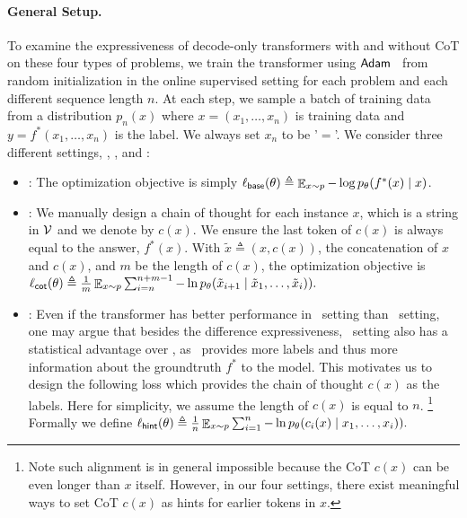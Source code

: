 \paragraph{General Setup.} 
To examine the expressiveness of decode-only transformers with and without CoT on these four types of problems, we train the transformer using $\mathsf{Adam}$~\citep{kingma2014adam} from random initialization in the online supervised setting for each problem and each different sequence length $n$. At each step, we sample a batch of training data from a distribution $p_n(x)$ where  $x= (x_1,\ldots,x_n)$ is training data and $y=f^*(x_1,\ldots,x_n)$ is the label. We always set $x_n$ to be '$=$'. We consider three different settings, \base, \cot, and  \hint:
\begin{itemize}
	\item \base: The optimization objective is simply $\ell_{{\sf{base}}}(\theta) \triangleq \operatorname*{\mathop \mathbb{E}}_{x\sim p}-\log p_\theta(f^*(x)\mid x)$.
	\item \cot: We manually design a chain of thought for each instance $x$, which is a string in ${\mathcal{V}}$ and we denote by $c(x)$. We ensure the last token of $c(x)$ is always equal to the answer, $f^*(x)$. With $\tilde x\triangleq (x,c(x))$, the concatenation of $x$ and $c(x)$, and $m$ be the length of $c(x)$, the optimization objective is
		$\ell_{\sf{cot}}(\theta)\triangleq \frac{1}{m}\operatorname*{\mathop \mathbb{E}}_{x\sim p}\sum\nolimits_{i=n}^{n+m-1} -\ln p_\theta(\tilde{x}_{i+1}\mid \tilde{x}_{1},\dots, \tilde{x}_{i})).$

	\item \hint: Even if the transformer has better performance in \cot\ setting than \base\ setting, one may argue that besides the difference expressiveness, \cot\ setting also has a statistical advantage over \base,  as \cot\ provides more labels and thus more information about the groundtruth $f^*$ to the model. This motivates us to design the following loss which provides the chain of thought $c(x)$ as the labels.
		Here for simplicity, we assume the length of $c(x)$ is equal to $n$. \footnote{Note such alignment is in general  impossible because the CoT $c(x)$ can be even longer than $x$ itself. However, in our four settings, there exist meaningful ways to set CoT $c(x)$ as hints for earlier tokens in $x$. } Formally we define  
		$\ell_{\sf{hint}}(\theta)\triangleq \frac{1}{n}\operatorname*{\mathop \mathbb{E}}_{x\sim p}\sum\nolimits_{i=1}^{n}-\ln p_\theta(c_i(x)\mid {x}_{1},\dots, {x}_{i})).$	
\end{itemize}

